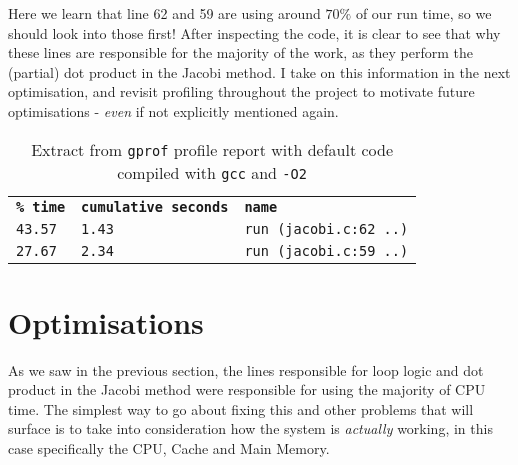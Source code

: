 \documentclass[10pt,twocolumn,a4paper]{article}
\begin{document}


Here we learn that line 62 and 59 are using around $70\%$ of our run time, so we should look into those first! After inspecting the code\cite{hpc-cw1-code}, it is clear to see that why these lines are responsible for the majority of the work, as they perform the (partial) dot product in the Jacobi method. I take on this information in the next optimisation, and revisit profiling throughout the project to motivate future optimisations - \textit{even} if not explicitly mentioned again.

\vspace{-0.2cm}
\begin{table}[h]
\small
\centering
{}
\begin{tabular}{A|B|C}
\textbf{\texttt{\% time}} & \textbf{\texttt{cumulative seconds}} & \textbf{\texttt{name}} \\
\texttt{43.57}  &  \texttt{1.43}  &  \texttt{run (jacobi.c:62 ..)} \\
\texttt{27.67}  &  \texttt{2.34}  &  \texttt{run (jacobi.c:59 ..)}
\end{tabular}
\caption{Extract from \texttt{gprof} profile report with default code compiled with \texttt{gcc} and \texttt{-O2}}
\label{profilingStock}
\end{table}\par
\vspace{-0.4cm}




\section{Optimisations}
As we saw in the previous section, the lines responsible for loop logic and dot product in the Jacobi method were responsible for using the majority of CPU time. The simplest way to go about fixing this and other problems that will surface is to take into consideration how the system is \textit{actually} working, in this case specifically the CPU, Cache and Main Memory.
\end{document}
